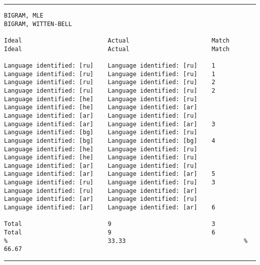 \tiny
\hrule\vskip4pt
\begin{verbatim}
BIGRAM, MLE                                                        BIGRAM, WITTEN-BELL

Ideal                        Actual                       Match    Ideal                        Actual                       Match

Language identified: [ru]    Language identified: [ru]    1        Language identified: [ru]    Language identified: [ru]    1
Language identified: [ru]    Language identified: [ru]    2        Language identified: [ru]    Language identified: [ru]    2
Language identified: [he]    Language identified: [ru]             Language identified: [he]    Language identified: [ar]
Language identified: [ar]    Language identified: [ru]             Language identified: [ar]    Language identified: [ar]    3
Language identified: [bg]    Language identified: [ru]             Language identified: [bg]    Language identified: [bg]    4
Language identified: [he]    Language identified: [ru]             Language identified: [he]    Language identified: [ru]
Language identified: [ar]    Language identified: [ru]             Language identified: [ar]    Language identified: [ar]    5
Language identified: [ru]    Language identified: [ru]    3        Language identified: [ru]    Language identified: [ar]
Language identified: [ar]    Language identified: [ru]             Language identified: [ar]    Language identified: [ar]    6

Total                        9                            3        Total                        9                            6
%                            33.33                                 %                            66.67
\end{verbatim}
\vskip4pt\hrule


